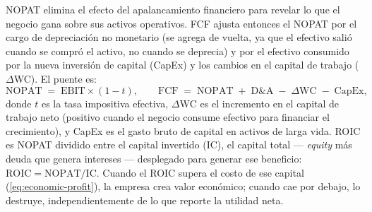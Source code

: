 NOPAT elimina el efecto del apalancamiento financiero para revelar lo que el negocio gana sobre sus
activos operativos. FCF ajusta entonces el NOPAT por el cargo de depreciación no monetario (se
agrega de vuelta, ya que el efectivo salió cuando se compró el activo, no cuando se deprecia) y por
el efectivo consumido por la nueva inversión de capital (CapEx) y los cambios en el capital de
trabajo (\(\Delta\)WC). El puente es:
\begin{equation}\label{eq:nopat-bridge}
  \mathrm{NOPAT} \;=\; \mathrm{EBIT} \times (1 - t),
  \qquad
  \mathrm{FCF} \;=\; \mathrm{NOPAT} \;+\; \mathrm{D\&A} \;-\; \Delta\mathrm{WC} \;-\; \mathrm{CapEx},
\end{equation}
donde \(t\) es la tasa impositiva efectiva, \(\Delta\mathrm{WC}\) es el incremento en el capital de
trabajo neto (positivo cuando el negocio consume efectivo para financiar el crecimiento), y CapEx es
el gasto bruto de capital en activos de larga vida. ROIC es NOPAT dividido entre el capital
invertido (IC), el capital total --- \emph{equity} más deuda que genera intereses --- desplegado
para generar ese beneficio: \(\mathrm{ROIC} = \mathrm{NOPAT} / \mathrm{IC}\). Cuando el ROIC
supera el costo de ese capital (\cref{eq:economic-profit}), la empresa crea valor económico; cuando
cae por debajo, lo destruye, independientemente de lo que reporte la utilidad neta.

